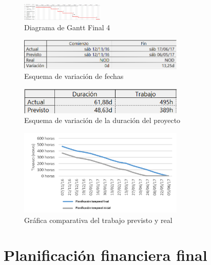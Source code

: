 \documentclass{pclass}
\begin{document}
\begin{figure}[H]
	\centering
	\includegraphics[angle=270,width=0.35\textwidth]{img/ganttFinal4}
	\caption{Diagrama de Gantt Final 4}
	\label{fig:ganttFinal4}
\end{figure}

\begin{figure}[H]
	\centering
	\includegraphics[width=0.7\textwidth]{img/variacionFechas}
	\caption{Esquema de variación de fechas}
	\label{fig:variacionFechas}
\end{figure}

\begin{figure}[H]
	\centering
	\includegraphics[width=0.7\textwidth]{img/variacionDuracion}
	\caption{Esquema de variación de la duración del proyecto}
	\label{fig:variacionDuracion}
\end{figure}

\begin{figure}[H]
	\centering
	\includegraphics[width=0.7\textwidth]{img/graficaComparativaTiempo}
	\caption{Gráfica comparativa del trabajo previsto y real}
	\label{fig:graficaComparativa}
\end{figure}

\section{Planificación financiera final} 
\end{document}
